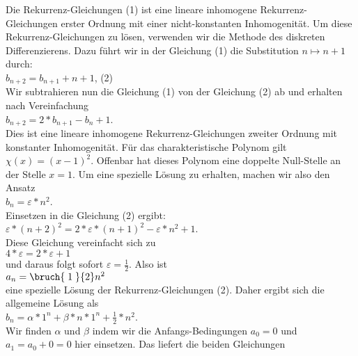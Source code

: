 Die Rekurrenz-Gleichungen (1) ist eine lineare inhomogene Rekurrenz-Gleichungen erster Ordnung mit einer
nicht-konstanten Inhomogenit\"at.
Um diese Rekurrenz-Gleichungen zu l\"osen, verwenden wir die Methode des diskreten Differenzierens.
Dazu f\"uhrt wir in der Gleichung (1) die Substitution
$n \mapsto n + 1$ durch: \\[0.1cm]
\hspace*{1.3cm} $b_{n+2} = b_{n+1} + n+1$, \hspace*{\fill} (2)\\[0.1cm]
Wir subtrahieren nun die Gleichung (1) von der Gleichung (2) ab und erhalten nach Vereinfachung \\[0.1cm]
\hspace*{1.3cm} $b_{n+2} = 2 * b_{n+1} - b_n + 1$. \\[0.1cm]
Dies ist eine lineare inhomogene Rekurrenz-Gleichungen zweiter Ordnung mit konstanter
Inhomogenit\"at.  F\"ur das charakteristische Polynom gilt $\chi(x) = (x-1)^2$.  Offenbar hat
dieses Polynom eine doppelte Null-Stelle an der Stelle $x=1$.  Um eine spezielle L\"osung zu
erhalten, machen wir also den Ansatz \\[0.1cm]
\hspace*{1.3cm} $\displaystyle b_n = \varepsilon * n^2$. \\[0.1cm]
Einsetzen in die Gleichung (2) ergibt: \\[0.1cm]
\hspace*{1.3cm} 
$\varepsilon * (n+2)^2 = 2 * \varepsilon * (n+1)^2 - \varepsilon * n^2 + 1$. \\[0.1cm]
Diese Gleichung vereinfacht sich zu \\[0.1cm]
\hspace*{1.3cm} $4* \varepsilon = 2 * \varepsilon + 1$ \\[0.1cm]
und daraus folgt sofort $\varepsilon = \frac{1}{2}$. Also ist \\[0.1cm]
\hspace*{1.3cm} $a_n = \bruch{\;1\;}{2} n^2$ \\[0.1cm]
eine spezielle L\"osung der Rekurrenz-Gleichungen (2).   Daher ergibt sich die allgemeine
L\"osung als \\[0.1cm]
\hspace*{1.3cm} $\displaystyle b_n = \alpha * 1^n + \beta * n * 1^n + \frac{1}{2} * n^2$. \\[0.1cm]
Wir finden $\alpha$ und $\beta$ indem wir die Anfangs-Bedingungen $a_0 = 0$ und 
$a_1 = a_0 + 0 = 0$ hier einsetzen.  Das liefert die beiden Gleichungen \\[0.1cm]
